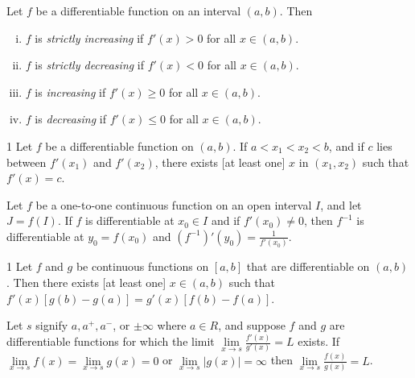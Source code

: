 \begin{theo}{1}
	Let $f$ be a differentiable function on an interval $(a, b)$. Then
	\begin{enumerate}[(i)]
		\item $f$ is \textit{strictly increasing} if $f'(x) > 0$ for all $x \in (a, b)$.
		\item $f$ is \textit{strictly decreasing} if $f'(x)< 0$ for all $x \in (a, b)$.
		\item $f$ is \textit{increasing} if $f'(x) \geq 0$ for all $x \in (a, b)$.
		\item $f$ is \textit{decreasing} if $f'(x) \leq 0$ for all $x \in (a, b)$.
	\end{enumerate}
\end{theo}

\begin{theo}{1}
	Let $f$ be a differentiable function on $(a, b)$. If $a < x_1 < x_2 < b$, and	if $c$ lies between $f'(x_1)$ and $f'(x_2)$, there exists [at least one] $x$ in $(x_1 , x_2)$ such that $f'(x) = c$.
\end{theo}

\begin{theo}{1}
	Let $f$ be a one-to-one continuous function on an open interval $I$, and	let $J = f (I)$. If $f$ is differentiable at $x_0 \in I$ and if $f'(x_0) \neq 0$, then $f^{-1}$ is differentiable at $y_0 = f(x_0)$ and	$(f^{-1})'(y_0) = \frac{1}{f'(x_0)}$.
\end{theo}

\begin{theo}{1}
	Let $f$ and $g$ be continuous functions on $[a, b]$ that are differentiable on $(a, b)$. Then there exists [at least one] $x \in (a, b)$ such that $f'(x)[g(b) - g(a)] = g'(x)[f (b) - f (a)]$.
\end{theo}

\begin{defn}{1}
	Let $s$ signify $a, a^+ , a^-$, or $\pm \infty$ where $a\in R$, and suppose $f$ and	$g$ are differentiable functions for which the limit $\lim\limits_{x\rightarrow s}\frac{f'(x)}{g'(x)}=L$ exists. If $\lim\limits_{x\rightarrow s} f(x) = \lim\limits_{x\rightarrow s} g(x)=0$ or $\lim\limits_{x\rightarrow s} |g(x)| = \infty$ then $\lim\limits_{x\rightarrow s}\frac{f(x)}{g(x)}=L$.
\end{defn}

